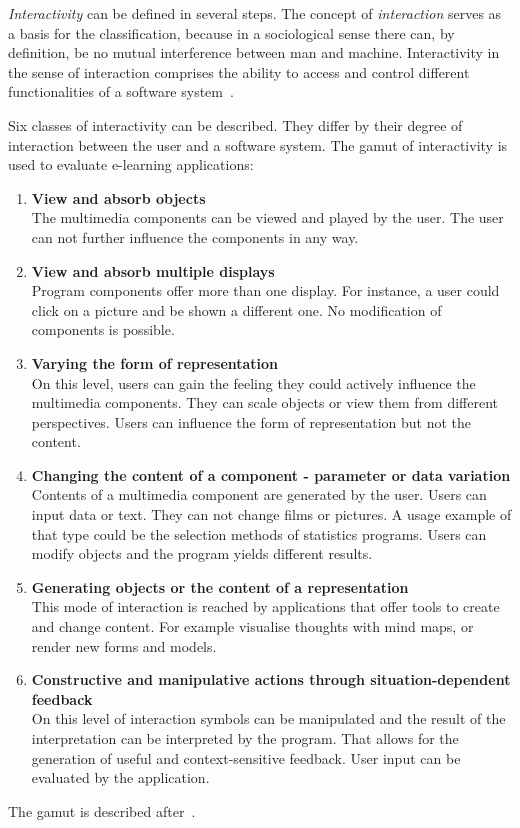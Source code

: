\emph{Interactivity} can be defined in several steps. The concept of 
\emph{interaction} serves as a basis for the classification, because in a 
sociological sense there can, by definition, be no mutual interference
between man and machine. Interactivity in the sense of interaction comprises
the ability to access and control different functionalities of a software 
system~.

Six classes of interactivity can be described. They differ by their degree of
interaction between the user and a software system.
The gamut of interactivity is used to evaluate e-learning applications:
\begin{enumerate}
\item \textbf{View and absorb objects} \\
      The multimedia components can be viewed and played by the user.
      The user can not further influence the components in any way.
\item \textbf{View and absorb multiple displays} \\
      Program components offer more than one display. For instance, a user
      could click on a picture and be shown a different one.
      No modification of components is possible.
\item \textbf{Varying the form of representation} \\
      On this level, users can gain the feeling they could actively influence
      the multimedia components. They can scale objects or view them from
      different perspectives. Users can influence the form of representation
      but not the content.
\item \label{elearn:class:changingcontent}
      \textbf{Changing the content of a component - parameter or data 
      variation} \\
      Contents of a multimedia component are generated by the user. Users can
      input data or text. They can not change films or pictures.
      A usage example of that type could be the selection methods of statistics
      programs. Users can modify objects and the program yields different 
      results.
\item \label{elearn:class:generateobjects}
      \textbf{Generating objects or the content of a representation} \\
      This mode of interaction is reached by applications that offer tools to
      create and change content. For example visualise thoughts with mind maps,
      or render new forms and models.
\item \label{elearn:class:constructivemanipulative}
      \textbf{Constructive and manipulative actions through 
      situation-dependent feedback} \\
      On this level of interaction symbols can be manipulated and the result of
      the interpretation can be interpreted by the program.
      That allows for the generation of useful and context-sensitive feedback.
      User input can be evaluated by the application.
\end{enumerate}
The gamut is described after~.

